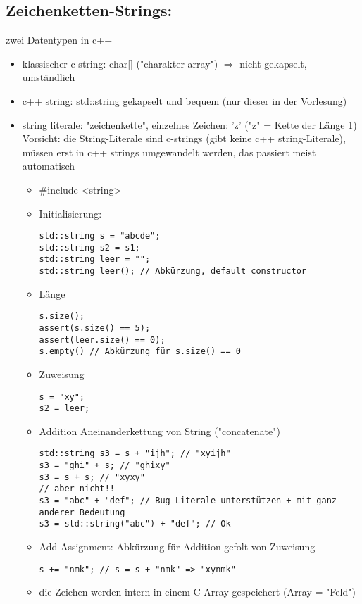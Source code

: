 \documentclass[a4paper]{scrartcl}
\begin{document}
\subsection{Zeichenketten-Strings:}
\label{sec-10-3}
zwei Datentypen in c++
\begin{itemize}
\item klassischer c-string: char[] ("charakter array") $\Rightarrow$ nicht gekapselt, umständlich
\item c++ string: std::string gekapselt und bequem (nur dieser in der Vorlesung)
\item string literale: "zeichenkette", einzelnes Zeichen: 'z' ("z" = Kette der Länge 1) \\
     Vorsicht: die String-Literale sind c-strings (gibt keine c++ string-Literale),
müssen erst in c++ strings umgewandelt werden, das passiert meist automatisch
\begin{itemize}
\item \#include <string>
\item Initialisierung:
\begin{verbatim}
std::string s = "abcde";
std::string s2 = s1;
std::string leer = "";
std::string leer(); // Abkürzung, default constructor
\end{verbatim}
\item Länge
\begin{verbatim}
s.size();
assert(s.size() == 5);
assert(leer.size() == 0);
s.empty() // Abkürzung für s.size() == 0
\end{verbatim}
\item Zuweisung
\begin{verbatim}
s = "xy";
s2 = leer;
\end{verbatim}
\item Addition
Aneinanderkettung von String ("concatenate")
\begin{verbatim}
std::string s3 = s + "ijh"; // "xyijh"
s3 = "ghi" + s; // "ghixy"
s3 = s + s; // "xyxy"
// aber nicht!!
s3 = "abc" + "def"; // Bug Literale unterstützen + mit ganz anderer Bedeutung
s3 = std::string("abc") + "def"; // Ok
\end{verbatim}
\item Add-Assignment: Abkürzung für Addition gefolt von Zuweisung
\begin{verbatim}
s += "nmk"; // s = s + "nmk" => "xynmk"
\end{verbatim}
\item die Zeichen werden intern in einem C-Array gespeichert (Array = "Feld") \\

\end{itemize}
\end{itemize}
\end{document}
